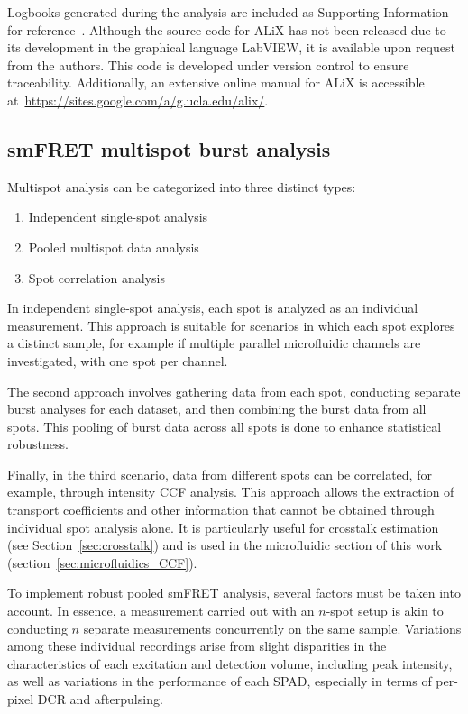 Logbooks generated during the analysis are included as Supporting Information for reference~\cite{figshare_repo_2019}. 
Although the source code for ALiX has not been released due to its development in the graphical language LabVIEW, it is available upon request from the authors. 
This code is developed under version control to ensure traceability. Additionally, an extensive online manual for ALiX is accessible at~\href{https://sites.google.com/a/g.ucla.edu/alix/}{https://sites.google.com/a/g.ucla.edu/alix/}.

\subsection{smFRET multispot burst analysis}
\label{sec:multispot_analysis}

Multispot analysis can be categorized into three distinct types:

\begin{enumerate}
\item Independent single-spot analysis
\item Pooled multispot data analysis
\item Spot correlation analysis
\end{enumerate}

In independent single-spot analysis, each spot is analyzed as an individual measurement. 
This approach is suitable for scenarios in which each spot explores a distinct sample, for example if multiple parallel microfluidic channels are investigated, with one spot per channel.

The second approach involves gathering data from each spot, conducting separate burst analyses for each dataset, and then combining the burst data from all spots. 
This pooling of burst data across all spots is done to enhance statistical robustness.

Finally, in the third scenario, data from different spots can be correlated, for example, through intensity \ac{CCF} analysis. 
This approach allows the extraction of transport coefficients and other information that cannot be obtained through individual spot analysis alone. 
It is particularly useful for crosstalk estimation (see Section~\ref{sec:crosstalk}) and is used in the microfluidic section of this work (section~\ref{sec:microfluidics_CCF}).

To implement robust pooled smFRET analysis, several factors must be taken into account. 
In essence, a measurement carried out with an $n$-spot setup is akin to conducting $n$ separate measurements concurrently on the same sample. 
Variations among these individual recordings arise from slight disparities in the characteristics of each excitation and detection volume, including peak intensity, as well as variations in the performance of each \ac{SPAD}, especially in terms of per-pixel \ac{DCR} and afterpulsing.

